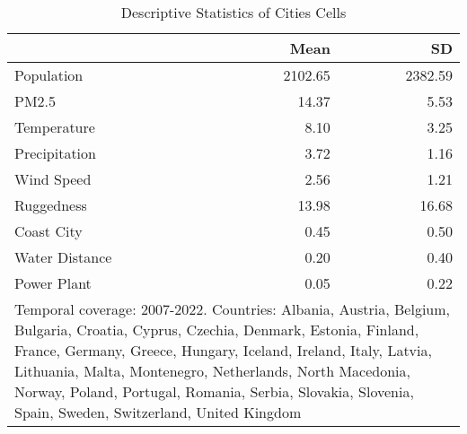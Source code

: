 \begin{table}

\caption{Descriptive Statistics of Cities Cells}
\centering
\begin{tabular}[t]{lrr}
\toprule
  & Mean & SD\\
\midrule
Population & \num{2102.65} & \num{2382.59}\\
PM2.5 & \num{14.37} & \num{5.53}\\
Temperature & \num{8.10} & \num{3.25}\\
Precipitation & \num{3.72} & \num{1.16}\\
Wind Speed & \num{2.56} & \num{1.21}\\
Ruggedness & \num{13.98} & \num{16.68}\\
Coast City & \num{0.45} & \num{0.50}\\
Water Distance & \num{0.20} & \num{0.40}\\
Power Plant & \num{0.05} & \num{0.22}\\
\bottomrule
\multicolumn{3}{l}{\rule{0pt}{1em}Temporal coverage: 2007-2022. Countries: Albania, Austria, Belgium, Bulgaria, Croatia, Cyprus, Czechia, Denmark, Estonia, Finland, France, Germany, Greece, Hungary, Iceland, Ireland, Italy, Latvia, Lithuania, Malta, Montenegro, Netherlands, North Macedonia, Norway, Poland, Portugal, Romania, Serbia, Slovakia, Slovenia, Spain, Sweden, Switzerland, United Kingdom}\\
\end{tabular}
\end{table}
